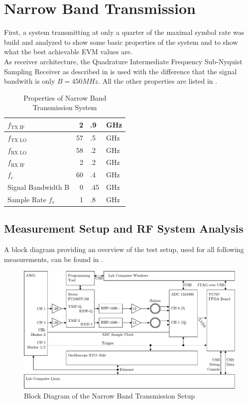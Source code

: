 \chapter{Narrow Band Transmission}
\label{chap:res_450}
First, a system transmitting at only a quarter of the maximal symbol rate
was build and analyzed to show some basic properties of the system and
to show what the best achievable \gls{EVM} values are. \\

As receiver architecture, the Quadrature Intermediate Frequency Sub-Nyquist
Sampling Receiver as described in  is used with the difference
that the signal bandwith is only $B = 450 MHz$. All the other properties are listed
in . \\

\begin{table}[h]
  \centering
  \begin{tabular}{|l|r@{}l@{~}l|}
    \hline
    $f_{\text{TX IF}}$ & 2&.9&GHz \\ \hline
    $f_{\text{TX LO}}$ & 57&.5&GHz \\ \hline
    $f_{\text{RX LO}}$ & 58&.2&GHz \\ \hline
    $f_{\text{RX IF}}$ & 2&.2&GHz \\ \hline
    $f_c$            & 60&.4&GHz \\ \hline
    Signal Bandwidth B & 0&.45&GHz \\ \hline
    Sample Rate $f_s$ & 1&.8&GHz \\ \hline
  \end{tabular}
  \caption{Properties of Narrow Band Transmission System}
  \label{tab:res_450}
\end{table}

\section{Measurement Setup and RF System Analysis}
\label{sec:res_450_setup}

A block diagram providing an overview of the test setup,
used for all following measurements, can be found in . \\

\begin{figure}[p]
  \centering
  \includegraphics[width=\textwidth]{figures/res_450_setup}
  \caption{Block Diagram of the Narrow Band Transmission Setup}
  \label{fig:res_450_bd}
\end{figure}

